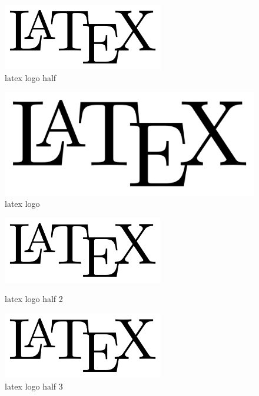 \begin{figure}[t]
  \begin{center}
    \includegraphics[width=7.0cm]{figs/latex_logo.png}
    \caption{latex logo half}
    \label{fig:latex_logo_half}
  \end{center}
\end{figure}

\begin{figure}[t]
\centering
    \includegraphics[width=\textwidth]{./figs/latex_logo.png}
    \caption{latex logo}
    \label{fig:latex_logo}
\end{figure}

\begin{figure}[htbp]
  \begin{minipage}{0.49\hsize}
   \begin{center}
    \includegraphics[width=7cm]{figs/latex_logo.png}
   \end{center}
   \caption{latex logo half 2}
   \label{fig:latex_logo_half_2}
  \end{minipage}
  \hspace{0.01\hsize}
  \begin{minipage}{0.49\hsize}
  \begin{center}
   \includegraphics[width=7cm]{figs/latex_logo.png}
  \end{center}
   \caption{latex logo half 3}
   \label{fig:latex_logo_half_3}
  \end{minipage}
 \end{figure}

